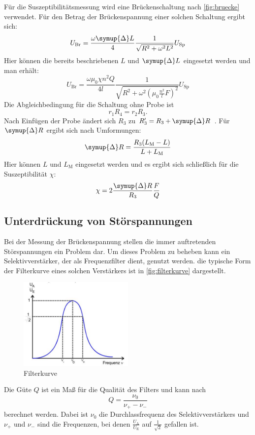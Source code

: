 Für die Suszeptibilitätsmessung wird eine Brückenschaltung nach \autoref{fig:bruecke} verwendet. Für den Betrag der Brückenspannung einer solchen Schaltung ergibt sich:
\begin{equation}
U_\text{Br} = \frac{\omega \symup{\Delta} L}{4} \frac{1}{\sqrt{R^2 + {\omega}^2 L^2 }} U_\text{Sp}
\end{equation}
Hier können die bereits beschriebenen $L$  und $\symup{\Delta} L$ eingesetzt werden und man erhält:
\begin{equation}
U_\text{Br} = \frac{\omega \mu_0 \chi n^2 Q}{4l} \frac{1}{\sqrt{R^2 + {\omega}^2(\mu_0 \frac{n^2}{l}F)^2}} U_\text{Sp}
\end{equation}
Die Abgleichbedingung für die Schaltung ohne Probe ist
\begin{equation}
    r_1 R_4 = r_2 R_3 .
\end{equation}
Nach Einfügen der Probe ändert sich $R_3$ zu $R'_3 = R_3 + \symup{\Delta}R$ .
Für $\symup{\Delta}R$ ergibt sich nach Umformungen:
\begin{equation}
    \symup{\Delta}R = \frac{R_3 (L_\text{M} - L)}{L + L_\text{M}} 
\end{equation}
Hier können $L$ und $L_\text{M}$ eingesetzt werden und es ergibt sich schließlich für die Suszeptibilität $\chi$:
\begin{equation}
    \label{eqn:chi}
    \chi = 2 \frac{\symup{\Delta}R}{R_3} \frac{F}{Q}
\end{equation}

\subsection{Unterdrückung von Störspannungen}
Bei der Messung der Brückenspannung stellen die immer auftretenden Störspannungen ein Problem dar. Um dieses Problem zu beheben kann ein Selektivverstärker, der als Frequenzfilter dient, genutzt werden. die typische Form der Filterkurve eines solchen Verstärkers ist in \autoref{fig:filterkurve} dargestellt.
\begin{figure}[H]
    \centering
    \includegraphics[width=0.5\textwidth]{content/filterkurve.jpg}
    \caption{Filterkurve \cite{versuchsanleitung}}
    \label{fig:filterkurve2}
  \end{figure}
Die Güte $Q$ ist ein Maß für die Qualität des Filters und kann nach 
  \begin{equation}
    \label{eqn:güte}
    Q = \frac{\nu_0}{\nu_+ - \nu_-}
\end{equation}
berechnet werden. Dabei ist $\nu_0$ die Durchlassfrequenz des Selektivverstärkers und $\nu_+$ und $\nu_-$ sind die Frequenzen,
bei denen $\frac{U_\text{A}}{U_\text{E}}$ auf $\frac{1}{\sqrt{2}}$ gefallen ist.